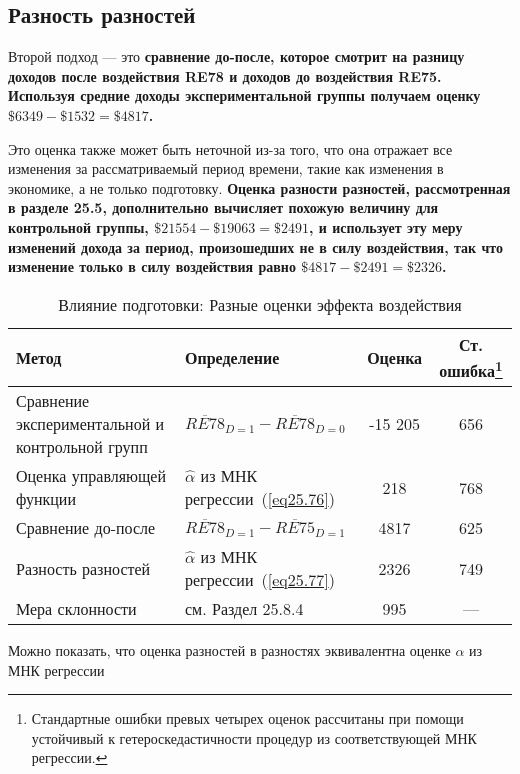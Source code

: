 \subsection{Разность разностей}

Второй подход --- это \bfseries сравнение до-после, \mdseries которое смотрит на разницу доходов после воздействия RE78 и доходов до воздействия RE75. Используя средние доходы экспериментальной группы получаем оценку $\$ 6 349 - \$ 1 532 = \$ 4 817$. 

Это оценка также может быть неточной из-за того, что она отражает все изменения за рассматриваемый период времени, такие как изменения в экономике, а не только подготовку. \bfseries Оценка разности разностей, \mdseries  рассмотренная в разделе 25.5, дополнительно вычисляет похожую величину для контрольной группы, $\$ 21 554 - \$ 19 063 = \$ 2 491$, и использует эту меру изменений дохода за период, произошедших не в силу воздействия, так что изменение только в силу воздействия равно $\$ 4 817 - \$ 2 491 = \$ 2 326$. 

\begin{table}[h]
\caption{\label{} Влияние подготовки: Разные оценки эффекта воздействия}
\begin{minipage}{17.5cm}
\begin{center}
\begin{tabular}{p{7cm}lcc}
\hline
\hline
Метод & Определение & Оценка &  Ст. ошибка\footnote{Стандартные ошибки превых четырех оценок рассчитаны при помощи устойчивый к гетероскедастичности процедур из соответствующей МНК регрессии.} \\
\hline
Сравнение экспериментальной и контрольной групп & $\overline{RE78}_{D=1} - \overline{RE78}_{D=0} $ & -15 205 & 656 \\
Оценка управляющей функции & $\widehat{\alpha}$ из МНК регрессии~(\ref{eq25.76}) & 218 & 768\\
Сравнение до-после & $\overline{RE78}_{D=1} - \overline{RE75}_{D=1} $ & 4817 & 625 \\
Разность разностей & $\widehat{\alpha}$ из МНК регрессии~(\ref{eq25.77}) & 2326 & 749 \\
Мера склонности & см. Раздел 25.8.4 & 995 & --- \\
\hline
\hline
\end{tabular}
\end{center}
\end{minipage}
\end{table}

Можно показать, что оценка разностей в разностях эквивалентна оценке $\alpha$ из МНК регрессии

